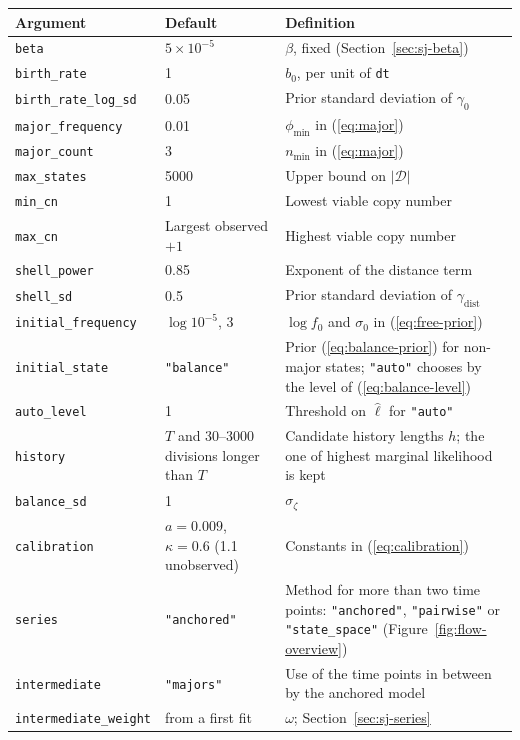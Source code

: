 \documentclass[11pt]{article}
\begin{document}
\begin{center}
\begin{tabular}{L{0.3\textwidth}L{0.22\textwidth}L{0.38\textwidth}}
\toprule
Argument & Default & Definition \\
\midrule
\texttt{beta} & $5\times10^{-5}$ & $\beta$, fixed (Section~\ref{sec:sj-beta}) \\
\texttt{birth\_rate} & 1 & $b_0$, per unit of \texttt{dt} \\
\texttt{birth\_rate\_log\_sd} & 0.05 & Prior standard deviation of $\gamma_0$ \\
\texttt{major\_frequency} & 0.01 & $\phi_{\min}$ in (\ref{eq:major}) \\
\texttt{major\_count} & 3 & $n_{\min}$ in (\ref{eq:major}) \\
\texttt{max\_states} & 5000 & Upper bound on $|\mathcal{D}|$ \\
\texttt{min\_cn} & 1 & Lowest viable copy number \\
\texttt{max\_cn} & Largest observed $+1$ & Highest viable copy number \\
\texttt{shell\_power} & 0.85 & Exponent of the distance term \\
\texttt{shell\_sd} & 0.5 & Prior standard deviation of $\gamma_{\mathrm{dist}}$ \\
\texttt{initial\_frequency} & $\log10^{-5}$, 3 & $\log f_0$ and $\sigma_0$ in (\ref{eq:free-prior}) \\
\texttt{initial\_state} & \texttt{"balance"} & Prior (\ref{eq:balance-prior}) for non-major states; \texttt{"auto"} chooses by the level of (\ref{eq:balance-level}) \\
\texttt{auto\_level} & 1 & Threshold on $\hat\ell$ for \texttt{"auto"} \\
\texttt{history} & $T$ and 30--3000 divisions longer than $T$ & Candidate
history lengths $h$; the one of highest marginal likelihood is kept \\
\texttt{balance\_sd} & 1 & $\sigma_\zeta$ \\
\texttt{calibration} & $a=0.009$, $\kappa=0.6$ (1.1 unobserved) & Constants in (\ref{eq:calibration}) \\
\texttt{series} & \texttt{"anchored"} & Method for more than two time points:
\texttt{"anchored"}, \texttt{"pairwise"} or \texttt{"state\_space"}
(Figure~\ref{fig:flow-overview}) \\
\texttt{intermediate} & \texttt{"majors"} & Use of the time points in between
by the anchored model \\
\texttt{intermediate\_weight} & from a first fit & $\omega$; Section~\ref{sec:sj-series} \\
\bottomrule
\end{tabular}
\end{center}
\end{document}
